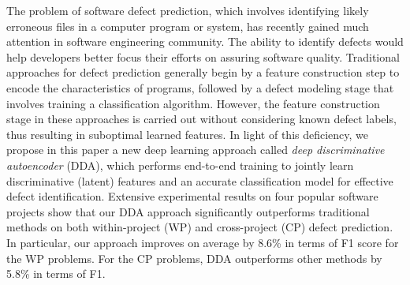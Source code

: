 The problem of software defect prediction, which involves identifying likely erroneous files in a computer program or system, has recently gained much attention in software engineering community. The ability to identify defects would help developers better focus their efforts on assuring software quality. Traditional approaches for defect prediction generally begin by a feature construction step to encode the characteristics of programs, followed by a defect modeling stage that involves training a classification algorithm. However, the feature construction stage in these approaches is carried out without considering known defect labels, thus resulting in suboptimal learned features. In light of this deficiency, we propose in this paper a new deep learning approach called \emph{deep discriminative autoencoder} (DDA), which performs end-to-end training to jointly learn discriminative (latent) features and an accurate classification model for effective defect identification. Extensive experimental results on four popular software projects show that our DDA approach significantly outperforms traditional methods on both within-project (WP) and cross-project (CP) defect prediction. In particular, our approach improves on average by 8.6\% in terms of F1 score for the WP problems. For the CP problems, DDA outperforms other methods by 5.8\% in terms of F1.





